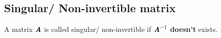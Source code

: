 \subsection{Singular/ Non-invertible matrix}

A matrix $\text{\textbf{\textit{A}}}$ is called singular/ non-invertible if $\text{\textbf{\textit{A}}}^{-1}$ \textbf{doesn't} exists.
\hfill \cite{mfml/book/mml/Deisenroth-Faisal-Ong}




